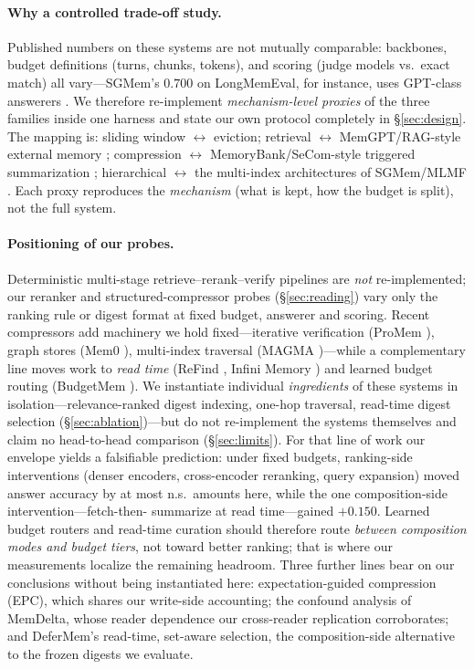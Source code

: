 \documentclass{article} %
\begin{document}
\paragraph{Why a controlled trade-off study.} Published numbers on these systems are not
mutually comparable: backbones, budget definitions (turns, chunks, tokens), and scoring
(judge models vs.\ exact match) all vary---SGMem's $0.700$ on LongMemEval, for instance, uses
GPT-class answerers \citep{wu2025sgmem}. We therefore re-implement \emph{mechanism-level
proxies} of the three families inside one harness and state our own protocol completely in
\S\ref{sec:design}. The mapping is: sliding window $\leftrightarrow$ eviction; retrieval
$\leftrightarrow$ MemGPT/RAG-style external memory \citep{packer2023memgpt,lewis2020retrieval};
compression $\leftrightarrow$ MemoryBank/SeCom-style triggered summarization
\citep{wu2024memorybank,pan2025secom}; hierarchical $\leftrightarrow$ the multi-index
architectures of SGMem/MLMF \citep{wu2025sgmem,mlmf2026}. Each proxy reproduces the
\emph{mechanism} (what is kept, how the budget is split), not the full system.

\paragraph{Positioning of our probes.} Deterministic multi-stage retrieve--rerank--verify
pipelines are \emph{not} re-implemented; our reranker and structured-compressor probes
(\S\ref{sec:reading}) vary only the ranking rule or digest format at fixed budget, answerer and
scoring. Recent compressors add machinery we hold fixed---iterative verification (ProMem
\citep{yang2026promem}), graph stores (Mem0 \citep{chhikara2025mem0}), multi-index traversal
(MAGMA \citep{jiang2026magma})---while a complementary line moves work to \emph{read time}
(ReFind \citep{li2026refind}, Infini Memory \citep{ji2026infini}) and learned budget routing
(BudgetMem \citep{zhang2026budgetmem}). We instantiate individual \emph{ingredients} of these
systems in isolation---relevance-ranked digest indexing, one-hop traversal, read-time digest
selection (\S\ref{sec:ablation})---but do not re-implement the systems themselves and claim no
head-to-head comparison (\S\ref{sec:limits}). For that line of work our
envelope yields a falsifiable prediction: under fixed budgets, ranking-side interventions
(denser encoders, cross-encoder reranking, query expansion) moved answer accuracy by
at most n.s.\ amounts here, while the one composition-side intervention---fetch-then-
summarize at read time---gained $+0.150$. Learned budget routers and read-time curation
should therefore route \emph{between composition modes and budget tiers}, not toward
better ranking; that is where our measurements localize the remaining headroom. Three
further lines bear on our conclusions without being instantiated here: expectation-guided
compression (EPC), which shares our write-side accounting; the confound analysis of
MemDelta, whose reader dependence our cross-reader replication corroborates; and DeferMem's
read-time, set-aware selection, the composition-side alternative to the frozen digests we
evaluate.
\end{document}
